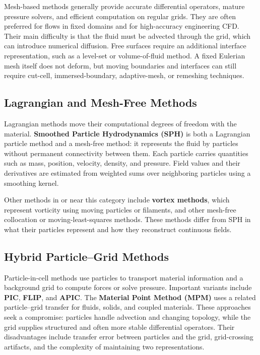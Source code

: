 \documentclass[11pt]{article}
\begin{document}
Mesh-based methods generally provide accurate differential operators, mature
pressure solvers, and efficient computation on regular grids. They are often
preferred for flows in fixed domains and for high-accuracy engineering CFD.
Their main difficulty is that the fluid must be advected through the grid,
which can introduce numerical diffusion. Free surfaces require an additional
interface representation, such as a level-set or volume-of-fluid method. A
fixed Eulerian mesh itself does not deform, but moving boundaries and interfaces
can still require cut-cell, immersed-boundary, adaptive-mesh, or remeshing
techniques.

\subsection{Lagrangian and Mesh-Free Methods}

Lagrangian methods move their computational degrees of freedom with the
material. \textbf{Smoothed Particle Hydrodynamics (SPH)} is both a Lagrangian
particle method and a mesh-free method: it represents the fluid by particles
without permanent connectivity between them. Each particle carries quantities
such as mass, position, velocity, density, and pressure. Field values and their
derivatives are estimated from weighted sums over neighboring particles using
a smoothing kernel.

Other methods in or near this category include \textbf{vortex methods}, which
represent vorticity using moving particles or filaments, and other mesh-free
collocation or moving-least-squares methods. These methods differ from SPH in
what their particles represent and how they reconstruct continuous fields.

\subsection{Hybrid Particle--Grid Methods}

Particle-in-cell methods use particles to transport material information and a
background grid to compute forces or solve pressure. Important variants include
\textbf{PIC}, \textbf{FLIP}, and \textbf{APIC}. The \textbf{Material Point
Method (MPM)} uses a related particle--grid transfer for fluids, solids, and
coupled materials. These approaches seek a compromise: particles handle
advection and changing topology, while the grid supplies structured and often
more stable differential operators. Their disadvantages include transfer error
between particles and the grid, grid-crossing artifacts, and the complexity of
maintaining two representations.
\end{document}
